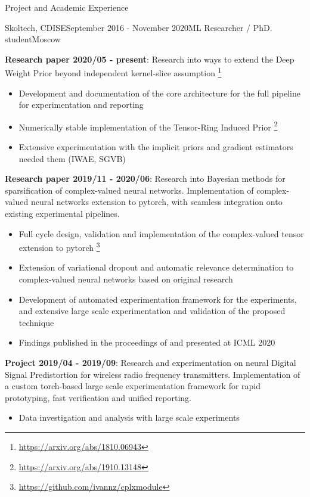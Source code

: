 \documentclass{resume} %
\begin{document}
\begin{rSection}{Project and Academic Experience}
\begin{rSubsection}{Skoltech, CDISE}{September 2016 - November 2020}{ML Researcher / PhD. student}{Moscow}
    \medskip
    \item \textbf{Research paper 2020/05 - present}:
    Research into ways to extend the Deep Weight Prior beyond independent kernel-slice assumption%
        \footnote{\url{https://arxiv.org/abs/1810.06943}}
    \begin{itemize}
        \item Development and documentation of the core architecture for the full pipeline for
        experimentation and reporting
        
        \item Numerically stable implementation of the Tensor-Ring Induced Prior%
            \footnote{\url{https://arxiv.org/abs/1910.13148}}
        
        \item Extensive experimentation with the implicit priors and gradient estimators
        needed them (IWAE, SGVB)
    \end{itemize}

    \medskip
    \item \textbf{Research paper 2019/11 - 2020/06}:
    Research into Bayesian methods for sparsification of complex-valued neural networks.
    Implementation of complex-valued neural networks extension to pytorch, with seamless
    integration onto existing experimental pipelines. \begin{itemize}
        \item Full cycle design, validation and implementation of the complex-valued tensor
        extension to pytorch%
            \footnote{\url{https://github.com/ivannz/cplxmodule}}
        
        \item Extension of variational dropout and automatic relevance determination to
        complex-valued neural networks based on original research
        
        \item Development of automated experimentation framework for the experiments, and
        extensive large scale experimentation and validation of the proposed technique
        
        \item Findings published in the proceedings of and presented at ICML 2020
    \end{itemize}

    \medskip
    \item \textbf{Project 2019/04 - 2019/09}:
    Research and experimentation on neural Digital Signal Predistortion for wireless radio
    frequency transmitters. Implementation of a custom torch-based large scale experimentation framework
    for rapid prototyping, fast verification and unified reporting. \begin{itemize}
        \item Data investigation and analysis with large scale experiments
        

\end{itemize}
\end{rSubsection}
\end{rSection}
\end{document}
